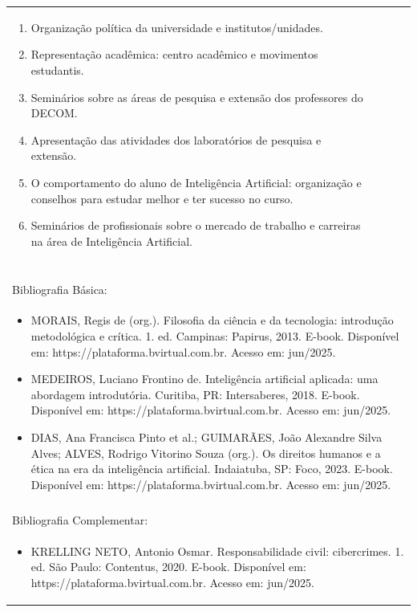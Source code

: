 \documentclass[11pt]{article}
\begin{document}
\begin{center}
\begin{longtable}{|p{4cm}|p{4cm}|p{4cm}|p{4cm}|}
{\begin{enumerate}
\item Organização política da universidade e institutos/unidades.
\item Representação acadêmica: centro acadêmico e movimentos estudantis.
\item Seminários sobre as áreas de pesquisa e extensão dos professores do DECOM.
\item Apresentação das atividades dos laboratórios de pesquisa e extensão.
\item O comportamento do aluno de Inteligência Artificial: organização e conselhos para estudar melhor e ter sucesso no curso.
\item Seminários de profissionais sobre o mercado de trabalho e carreiras na área de Inteligência Artificial.\end{enumerate}}\\
\multicolumn{4}{|p{16cm}|}{}\\
\multicolumn{4}{|p{16cm}|}{}\\
\multicolumn{4}{|p{16cm}|}{\vspace{-1cm}}\\
\multicolumn{4}{|p{16cm}|}{}\\
\hline
\multicolumn{4}{|p{16cm}|}{Bibliografia Básica:}\\
\multicolumn{4}{|p{16cm}|}{%
\begin{itemize}\item MORAIS, Regis de (org.). Filosofia da ciência e da tecnologia: introdução metodológica e crítica. 1. ed. Campinas: Papirus, 2013. E-book. Disponível em: https://plataforma.bvirtual.com.br. Acesso em: jun/2025.
\item MEDEIROS, Luciano Frontino de. Inteligência artificial aplicada: uma abordagem introdutória. Curitiba, PR: Intersaberes, 2018. E-book. Disponível em: https://plataforma.bvirtual.com.br. Acesso em: jun/2025.
\item DIAS, Ana Francisca Pinto et al.; GUIMARÃES, João Alexandre Silva Alves; ALVES, Rodrigo Vitorino Souza (org.). Os direitos humanos e a ética na era da inteligência artificial. Indaiatuba, SP: Foco, 2023. E-book. Disponível em: https://plataforma.bvirtual.com.br. Acesso em: jun/2025.\end{itemize}}\\
\multicolumn{4}{|p{16cm}|}{}\\
\hline
\multicolumn{4}{|p{16cm}|}{Bibliografia Complementar:}\\
\multicolumn{4}{|p{16cm}|}{%
\begin{itemize}\item KRELLING NETO, Antonio Osmar. Responsabilidade civil: cibercrimes. 1. ed. São Paulo: Contentus, 2020. E-book. Disponível em: https://plataforma.bvirtual.com.br. Acesso em: jun/2025.

\end{itemize}}
\end{longtable}
\end{center}
\end{document}
